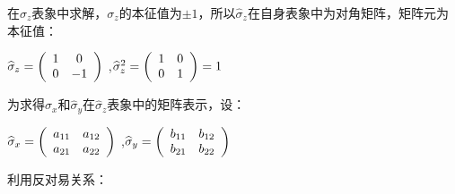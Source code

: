 在$\hat \sigma_z$表象中求解，$\sigma_z$的本征值为$\pm 1$，所以$\hat \sigma_z$在自身表象中为对角矩阵，矩阵元为本征值：

$\widehat\sigma _z  = \left( {\begin{array}{*{20}c}
   1 & 0  \\
   0 & { - 1}  \\
\end{array}} \right)$
,$\widehat\sigma _z ^2  = \left( {\begin{array}{*{20}c}
   1 & 0  \\
   0 & 1  \\
\end{array}} \right) = 1$

为求得$\hat \sigma_x$和$\hat \sigma_y$在$\hat \sigma_z$表象中的矩阵表示，设：


$\widehat\sigma _x  = \left( {\begin{array}{*{20}c}
   {a_{11} } & {a_{12} }  \\
   {a_{21} } & {a_{22} }  \\
\end{array}} \right)$
,$\widehat\sigma _y  = \left( {\begin{array}{*{20}c}
   {b_{11} } & {b_{12} }  \\
   {b_{21} } & {b_{22} }  \\
\end{array}} \right)$

利用反对易关系：

